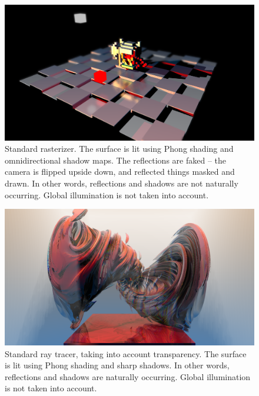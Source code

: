 \documentclass[12pt]{article}
\begin{document}
\begin{figure} 
\centering
  \includegraphics[width = 6 in]{rasterizer.png}
  \caption{ Standard rasterizer.
The surface is lit using Phong shading and omnidirectional shadow maps.
The reflections are faked -- the camera is flipped upside down, and reflected things masked and drawn.
In other words, reflections and shadows are not naturally occurring.
Global illumination is not taken into account.
}

\end{figure}




\begin{figure} 
\centering
  \includegraphics[width = 6 in]{v_rt_reflect.png}
  \caption{ Standard ray tracer, taking into account transparency.
The surface is lit using Phong shading and sharp shadows.
In other words, reflections and shadows are naturally occurring.
Global illumination is not taken into account.
}
\end{figure}
\end{document}
